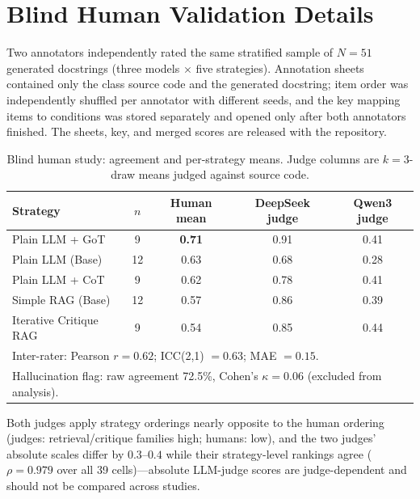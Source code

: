 \documentclass[pdflatex,sn-mathphys-ay]{sn-jnl}%
\theoremstyle{thmstyleone}%
\theoremstyle{thmstyletwo}%
\theoremstyle{thmstylethree}%
\begin{document}
\section{Blind Human Validation Details}
\label{app:human-validation}
Two annotators independently rated the same stratified sample of $N{=}51$ generated docstrings (three models $\times$ five strategies). Annotation sheets contained only the class source code and the generated docstring; item order was independently shuffled per annotator with different seeds, and the key mapping items to conditions was stored separately and opened only after both annotators finished. The sheets, key, and merged scores are released with the repository.

\begin{table}[h]
\centering
\small
\caption{Blind human study: agreement and per-strategy means. Judge columns are $k{=}3$-draw means judged against source code.}
\label{tab:blind-details}
\begin{tabular}{lcccc}
\toprule
\textbf{Strategy} & \textbf{$n$} & \textbf{Human mean} & \textbf{DeepSeek judge} & \textbf{Qwen3 judge} \\
\midrule
Plain LLM + GoT        & 9  & \textbf{0.71} & 0.91 & 0.41 \\
Plain LLM (Base)       & 12 & 0.63 & 0.68 & 0.28 \\
Plain LLM + CoT        & 9  & 0.62 & 0.78 & 0.41 \\
Simple RAG (Base)      & 12 & 0.57 & 0.86 & 0.39 \\
Iterative Critique RAG & 9  & 0.54 & 0.85 & 0.44 \\
\midrule
\multicolumn{5}{l}{Inter-rater: Pearson $r=0.62$; ICC(2,1) $=0.63$; MAE $=0.15$.} \\
\multicolumn{5}{l}{Hallucination flag: raw agreement 72.5\%, Cohen's $\kappa=0.06$ (excluded from analysis).} \\
\bottomrule
\end{tabular}
\end{table}

Both judges apply strategy orderings nearly opposite to the human ordering (judges: retrieval/critique families high; humans: low), and the two judges' absolute scales differ by $0.3$--$0.4$ while their strategy-level rankings agree ($\rho=0.979$ over all 39 cells)---absolute LLM-judge scores are judge-dependent and should not be compared across studies.
\end{document}
